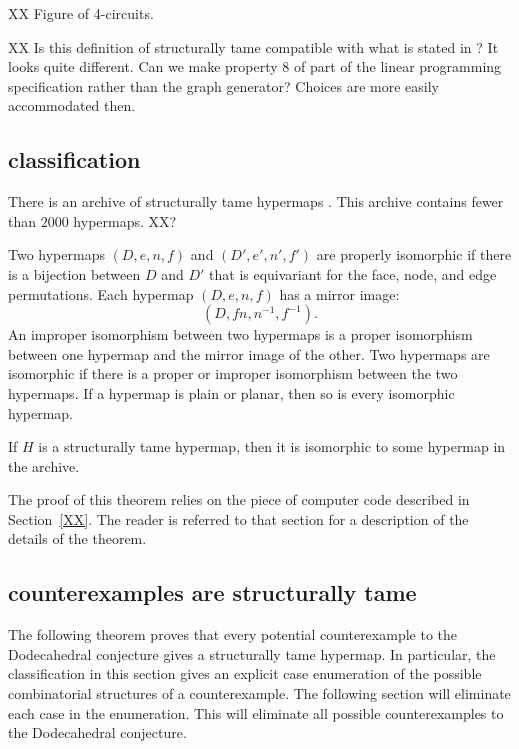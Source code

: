 XX Figure of 4-circuits.  \label{fig:quadtype}

XX Is this definition of structurally tame 
compatible with what is stated in \cite{arx}? It looks quite different.
Can we make property $8$ of \cite[p.46]{arx} part of the linear programming specification
rather than the graph generator?  Choices are more easily accommodated then.

\subsection{classification}

There is an archive of structurally tame hypermaps \cite{code}.  This
archive contains fewer than $2000$ hypermaps. XX?  

Two hypermaps $(D,e,n,f)$ and $(D',e',n',f')$ are properly isomorphic if there
is a bijection between $D$ and $D'$ that is equivariant for the face, node, and
edge permutations.  Each hypermap $(D,e,n,f)$ has a mirror image:
  $$
  (D,f n, n^{-1},f^{-1}).
  $$
  An improper
isomorphism between two hypermaps is a proper isomorphism between one hypermap and the
mirror image of the other.
Two hypermaps are isomorphic if there is a proper or improper isomorphism between
the two hypermaps. If a hypermap is plain or planar, then so is every isomorphic
hypermap.

\begin{theorem}  If $H$ is a structurally tame hypermap, then it is isomorphic to
some hypermap in the archive.
\end{theorem}

The proof of this theorem relies on the piece of 
computer code described in Section~\ref{XX}.  The reader is referred to that section
for a description of the details of the theorem.

\subsection{counterexamples are structurally tame}

The following theorem proves that every potential counterexample to the Dodecahedral
conjecture gives a structurally tame hypermap.  In particular, the classification
in this section gives an explicit case enumeration of the possible combinatorial structures
of a counterexample.  The following section will eliminate each case in the enumeration.
This will eliminate all possible counterexamples to the Dodecahedral conjecture.

